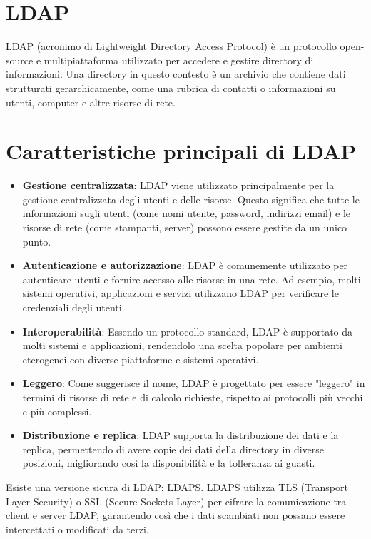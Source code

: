 \documentclass[12pt,a4paper]{report}
\begin{document}
\section{LDAP}
LDAP (acronimo di Lightweight Directory Access Protocol) è un protocollo open-source e multipiattaforma utilizzato per accedere e gestire directory di informazioni. Una directory in questo contesto è un archivio che contiene dati strutturati gerarchicamente, come una rubrica di contatti o informazioni su utenti, computer e altre risorse di rete.
\section{Caratteristiche principali di LDAP}
\begin{itemize}
    \item \textbf{Gestione centralizzata}: LDAP viene utilizzato principalmente per la gestione centralizzata degli utenti e delle risorse. Questo significa che tutte le informazioni sugli utenti (come nomi utente, password, indirizzi email) e le risorse di rete (come stampanti, server) possono essere gestite da un unico punto.
    \item \textbf{Autenticazione e autorizzazione}: LDAP è comunemente utilizzato per autenticare utenti e fornire accesso alle risorse in una rete. Ad esempio, molti sistemi operativi, applicazioni e servizi utilizzano LDAP per verificare le credenziali degli utenti.
    \item \textbf{Interoperabilità}: Essendo un protocollo standard, LDAP è supportato da molti sistemi e applicazioni, rendendolo una scelta popolare per ambienti eterogenei con diverse piattaforme e sistemi operativi.
    \item \textbf{Leggero}: Come suggerisce il nome, LDAP è progettato per essere "leggero" in termini di risorse di rete e di calcolo richieste, rispetto ai protocolli più vecchi e più complessi.
    \item \textbf{Distribuzione e replica}: LDAP supporta la distribuzione dei dati e la replica, permettendo di avere copie dei dati della directory in diverse posizioni, migliorando così la disponibilità e la tolleranza ai guasti.
\end{itemize}
Esiste una versione sicura di LDAP: LDAPS. LDAPS utilizza TLS (Transport Layer Security) o SSL (Secure Sockets Layer) per cifrare la comunicazione tra client e server LDAP, garantendo così che i dati scambiati non possano essere intercettati o modificati da terzi.
\end{document}
